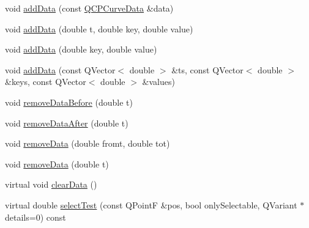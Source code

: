 \begin{DoxyCompactItemize}
\item 
void \hyperlink{class_q_c_p_curve_ad304326aba096911f92452d8bfe0470e}{add\+Data} (const \hyperlink{class_q_c_p_curve_data}{Q\+C\+P\+Curve\+Data} \&data)
\item 
void \hyperlink{class_q_c_p_curve_a13398b236f6926014e404eeb5b9f415c}{add\+Data} (double t, double key, double value)
\item 
void \hyperlink{class_q_c_p_curve_ada4762e793cd5707b33f35b8a4b0f8fb}{add\+Data} (double key, double value)
\item 
void \hyperlink{class_q_c_p_curve_a27c8b3dddd4067d626397ee199626722}{add\+Data} (const Q\+Vector$<$ double $>$ \&ts, const Q\+Vector$<$ double $>$ \&keys, const Q\+Vector$<$ double $>$ \&values)
\item 
void \hyperlink{class_q_c_p_curve_af6f4284fbc2f34e676f24dce03c34fe5}{remove\+Data\+Before} (double t)
\item 
void \hyperlink{class_q_c_p_curve_a0365cb947c4e6d405ee22e00191d5f52}{remove\+Data\+After} (double t)
\item 
void \hyperlink{class_q_c_p_curve_ad45bb5479be799163028ef2b776f7221}{remove\+Data} (double fromt, double tot)
\item 
void \hyperlink{class_q_c_p_curve_a30c91acfa591ec534c49fed4c0fca39a}{remove\+Data} (double t)
\item 
virtual void \hyperlink{class_q_c_p_curve_ae0462c61dbfbac07db0736ec64110241}{clear\+Data} ()
\item 
virtual double \hyperlink{class_q_c_p_curve_a87a9fb34a2a48dcae4c1245ada235e7d}{select\+Test} (const Q\+PointF \&pos, bool only\+Selectable, Q\+Variant $\ast$details=0) const
\end{DoxyCompactItemize}
